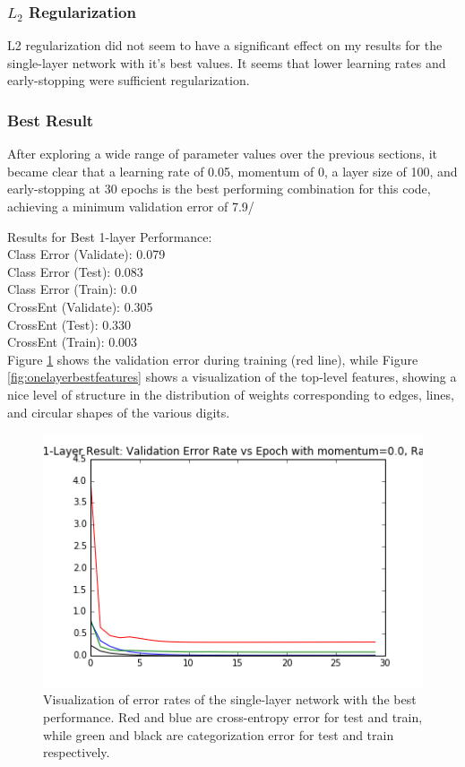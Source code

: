 \documentclass{article}
\begin{document}
\subsubsection*{$L_2$ Regularization}
L2 regularization did not seem to have a significant effect on my results for the single-layer network with it's best values. It seems that lower learning rates and early-stopping were sufficient regularization. 

\subsubsection*{Best Result}
After exploring a wide range of parameter values over the previous sections, it became clear that a learning rate of 0.05, momentum of 0, a layer size of 100, and early-stopping at 30 epochs is the best performing combination for this code, achieving a minimum validation error of 7.9/%

Results for Best 1-layer Performance:\\
Class Error (Validate): 0.079\\
Class Error (Test):		0.083\\
Class Error (Train):	0.0\\
CrossEnt (Validate):	0.305\\
CrossEnt (Test):		0.330\\
CrossEnt (Train): 		0.003\\

Figure \ref{fig:onelayerbest} shows the validation error during training (red line), while Figure \ref{fig:onelayerbestfeatures} shows a visualization of the top-level features, showing a nice level of structure in the distribution of weights corresponding to edges, lines, and circular shapes of the various digits. 



\begin{figure}[h]
  \centering
  \includegraphics[scale=0.6]{../one_layer_best.png} 
  \caption{Visualization of error rates of the single-layer network with the best performance. Red and blue are cross-entropy error for test and train, while green and black are categorization error for test and train respectively. }
  \label{fig:onelayerbest}
\end{figure}
\end{document}
